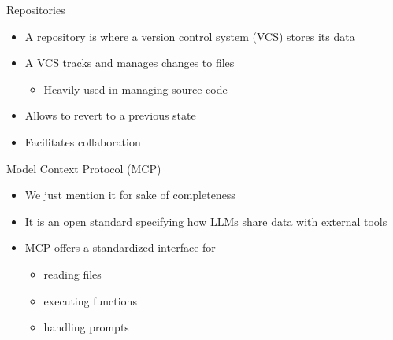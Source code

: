 \documentclass[
ps,
]{prosper}
\begin{document}
\begin{slide}{Repositories}

\begin{itemize}

\item A repository is where a version control system (VCS) stores its data

\item A VCS tracks and manages changes to files

\begin{itemize}

\item Heavily used in managing source code

\end{itemize}

\item Allows to revert to a previous state

\item Facilitates collaboration 

\end{itemize}
  
\end{slide}



\begin{slide}{Model Context Protocol (MCP)}

\begin{itemize}

\item We just mention it for sake of completeness

\item It is an open standard specifying how LLMs share data with external
  tools

\item MCP offers a standardized interface for

  \begin{itemize}

  \item reading files

  \item executing functions

  \item handling prompts

  \end{itemize}

\end{itemize}
  
\end{slide}
\end{document}
